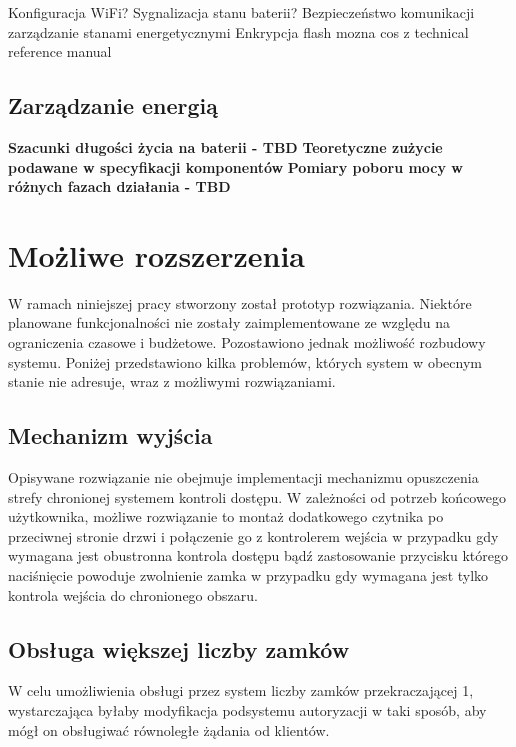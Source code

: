         Konfiguracja WiFi?
        Sygnalizacja stanu baterii?
        Bezpieczeństwo komunikacji
        zarządzanie stanami energetycznymi
        Enkrypcja flash
        mozna cos z technical reference manual

        \subsection{Zarządzanie energią}

            \textbf{Szacunki długości życia na baterii - TBD}
            \textbf{Teoretyczne zużycie podawane w specyfikacji komponentów}
            \textbf{Pomiary poboru mocy w różnych fazach działania - TBD}

    \section{Możliwe rozszerzenia}

        W ramach niniejszej pracy stworzony został prototyp rozwiązania. Niektóre planowane funkcjonalności nie zostały zaimplementowane ze względu na ograniczenia czasowe i budżetowe. Pozostawiono jednak możliwość rozbudowy systemu. Poniżej przedstawiono kilka problemów, których system w obecnym stanie nie adresuje, wraz z możliwymi rozwiązaniami.

        \subsection{Mechanizm wyjścia}

            Opisywane rozwiązanie nie obejmuje implementacji mechanizmu opuszczenia strefy chronionej systemem kontroli dostępu. W zależności od potrzeb końcowego użytkownika, możliwe rozwiązanie to montaż dodatkowego czytnika po przeciwnej stronie drzwi i połączenie go z kontrolerem wejścia w przypadku gdy wymagana jest obustronna kontrola dostępu bądź zastosowanie przycisku którego naciśnięcie powoduje zwolnienie zamka w przypadku gdy wymagana jest tylko kontrola wejścia do chronionego obszaru.

        \subsection{Obsługa większej liczby zamków}

            W celu umożliwienia obsługi przez system liczby zamków przekraczającej 1, wystarczająca byłaby modyfikacja podsystemu autoryzacji w taki sposób, aby mógł on obsługiwać równoległe żądania od klientów.

